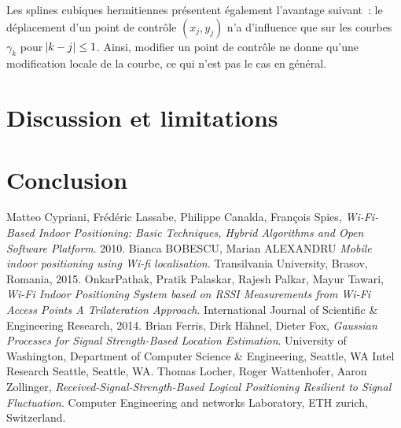 \documentclass[10pt,journal,compsoc]{IEEEtran}
\begin{document}
	  Les splines cubiques hermitiennes présentent également l'avantage suivant~: le déplacement d'un point de contrôle $(x_j, y_j)$ n'a d'influence que sur les courbes
	  $\gamma_k$ pour $\abs {k-j} \leq 1$. Ainsi, modifier un point de contrôle ne donne qu'une modification locale de la courbe, ce qui n'est pas le cas en général.
\section{Discussion et limitations}
\section{Conclusion}

\begin{thebibliography}{9}
    Matteo Cypriani, Frédéric Lassabe, Philippe Canalda, François Spies,
    \emph{Wi-Fi-Based Indoor Positioning: Basic Techniques, Hybrid Algorithms and Open Software Platform}.
    2010.
    Bianca BOBESCU, Marian ALEXANDRU
    \emph{Mobile indoor positioning using Wi-fi localisation}.
    Transilvania University, Brasov, Romania,
    2015.
    OnkarPathak, Pratik Palaskar, Rajesh Palkar, Mayur Tawari,
    \emph{Wi-Fi Indoor Positioning System based on RSSI Measurements from Wi-Fi Access Points A Trilateration Approach}.
    International Journal of Scientific \& Engineering Research,
    2014.
    Brian Ferris, Dirk Hähnel, Dieter Fox,
    \emph{Gaussian Processes for Signal Strength-Based Location Estimation}.
    University of Washington, Department of Computer Science \& Engineering, Seattle, WA Intel Research Seattle, Seattle, WA.
    Thomas Locher, Roger Wattenhofer, Aaron Zollinger,
    \emph{Received-Signal-Strength-Based Logical Positioning Resilient to Signal Fluctuation}.
    Computer Engineering and networks Laboratory, ETH zurich, Switzerland.
\end{thebibliography}
\end{document}

